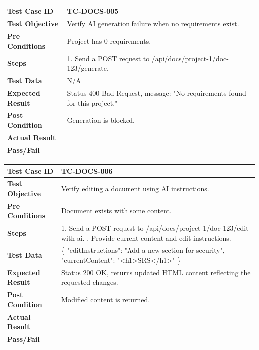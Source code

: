 \begin{longtable}{|p{}|p{}|}
\hline
\textbf{Test Case ID} & TC-DOCS-005 \\ \hline
\textbf{Test Objective} & Verify AI generation failure when no requirements exist. \\ \hline
\textbf{Pre Conditions} & Project has 0 requirements. \\ \hline
\textbf{Steps} & 
1. Send a POST request to /api/docs/project-1/doc-123/generate. \\ \hline
\textbf{Test Data} & N/A \\ \hline
\textbf{Expected Result} & Status 400 Bad Request, message: "No requirements found for this project." \\ \hline
\textbf{Post Condition} & Generation is blocked. \\ \hline
\textbf{Actual Result} &  \\ \hline
\textbf{Pass/Fail} &  \\ \hline
\end{longtable}

\begin{longtable}{|p{}|p{}|}
\hline
\textbf{Test Case ID} & TC-DOCS-006 \\ \hline
\textbf{Test Objective} & Verify editing a document using AI instructions. \\ \hline
\textbf{Pre Conditions} & Document exists with some content. \\ \hline
\textbf{Steps} & 
1. Send a POST request to /api/docs/project-1/doc-123/edit-with-ai. \newline
2. Provide current content and edit instructions. \\ \hline
\textbf{Test Data} & \{ "editInstructions": "Add a new section for security", "currentContent": "<h1>SRS</h1>" \} \\ \hline
\textbf{Expected Result} & Status 200 OK, returns updated HTML content reflecting the requested changes. \\ \hline
\textbf{Post Condition} & Modified content is returned. \\ \hline
\textbf{Actual Result} &  \\ \hline
\textbf{Pass/Fail} &  \\ \hline
\end{longtable}

